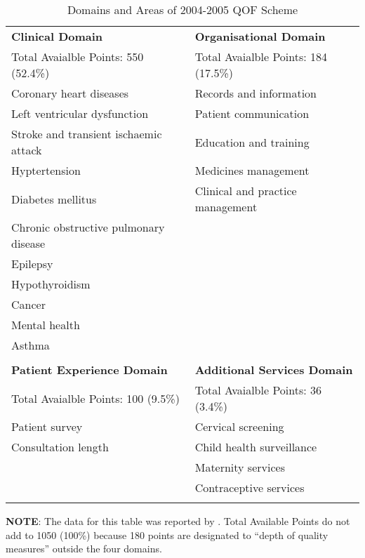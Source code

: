 \documentclass[12pt]{article}
\begin{document}
\begin{table}
  \centering
  \caption{Domains and Areas of 2004-2005 QOF Scheme}
  \begin{center}
  \begin{threeparttable}
\begin{tabular}{|l|l|}
  \hline
  \textbf{Clinical Domain} & \textbf{Organisational Domain} \\
  Total Avaialble  Points: 550 (52.4\%) & Total Avaialble Points: 184 (17.5\%) \\
  \hline
  Coronary heart diseases & Records and information\\
  Left ventricular dysfunction & Patient communication \\
  Stroke and transient ischaemic attack & Education and training\\
  Hyptertension & Medicines management\\
  Diabetes mellitus & Clinical and practice management\\
  Chronic obstructive pulmonary disease & \\
  Epilepsy & \\
  Hypothyroidism & \\
  Cancer & \\
  Mental health & \\
  Asthma & \\
  & \\
  \hline
  \textbf{Patient Experience Domain} & \textbf{Additional Services Domain} \\
  Total Avaialble  Points: 100 (9.5\%)  & Total Avaialble Points: 36 (3.4\%) \\
  \hline
   Patient survey & Cervical screening \\
   Consultation length & Child health surveillance \\
   & Maternity services \\
   & Contraceptive services \\
   & \\
   \hline
\end{tabular}
\begin{tablenotes}
  \footnotesize
\textbf{NOTE}: The data for this table was reported by \citet{lesterDevelopingQualityOutcomes2010}. Total Available Points do not add to 1050 (100\%) because 180 points are designated to ``depth of quality measures'' outside the four domains.
\end{tablenotes}
\end{threeparttable}
\end{center}
\label{2004QOFAreasByDomain}
\end{table}
\end{document}

